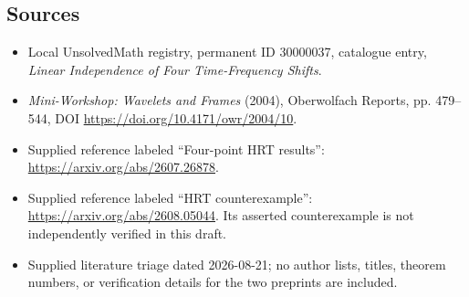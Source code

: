 \documentclass[11pt]{article}
\begin{document}
\subsection{Sources}
\begin{itemize}
\item Local UnsolvedMath registry, permanent ID 30000037, catalogue entry, \emph{Linear Independence of Four Time-Frequency Shifts}.
\item \emph{Mini-Workshop: Wavelets and Frames} (2004), Oberwolfach Reports, pp. 479--544, DOI \url{https://doi.org/10.4171/owr/2004/10}.
\item Supplied reference labeled ``Four-point HRT results'': \url{https://arxiv.org/abs/2607.26878}.
\item Supplied reference labeled ``HRT counterexample'': \url{https://arxiv.org/abs/2608.05044}. Its asserted counterexample is not independently verified in this draft.
\item Supplied literature triage dated 2026-08-21; no author lists, titles, theorem numbers, or verification details for the two preprints are included.
\end{itemize}
\end{document}
